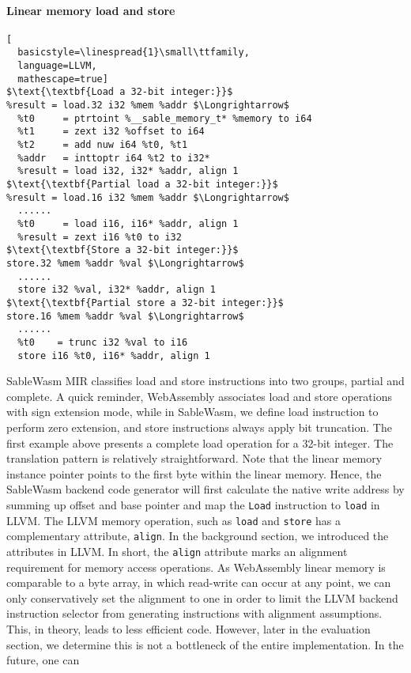 \paragraph{Linear memory load and store} \quad
\begin{lstlisting}[
  basicstyle=\linespread{1}\small\ttfamily, 
  language=LLVM, 
  mathescape=true]
$\text{\textbf{Load a 32-bit integer:}}$
%result = load.32 i32 %mem %addr $\Longrightarrow$
  %t0     = ptrtoint %__sable_memory_t* %memory to i64
  %t1     = zext i32 %offset to i64
  %t2     = add nuw i64 %t0, %t1
  %addr   = inttoptr i64 %t2 to i32*
  %result = load i32, i32* %addr, align 1
$\text{\textbf{Partial load a 32-bit integer:}}$
%result = load.16 i32 %mem %addr $\Longrightarrow$
  ......
  %t0     = load i16, i16* %addr, align 1
  %result = zext i16 %t0 to i32
$\text{\textbf{Store a 32-bit integer:}}$
store.32 %mem %addr %val $\Longrightarrow$
  ......
  store i32 %val, i32* %addr, align 1
$\text{\textbf{Partial store a 32-bit integer:}}$
store.16 %mem %addr %val $\Longrightarrow$
  ...... 
  %t0    = trunc i32 %val to i16
  store i16 %t0, i16* %addr, align 1
\end{lstlisting}
SableWasm MIR classifies load and store instructions into two groups,
partial and complete. A quick reminder, WebAssembly associates load and store
operations with sign extension mode, while in SableWasm, we define load
instruction to perform zero extension, and store instructions always apply bit
truncation. The first example above presents a complete load operation for a
32-bit integer. The translation pattern is relatively straightforward. Note
that the linear memory instance pointer points to the first byte within the
linear memory. Hence, the SableWasm backend code generator will first calculate
the native write address by summing up offset and base pointer and map the
\texttt{Load} instruction to \texttt{load} in LLVM. The LLVM memory operation,
such as \texttt{load} and \texttt{store} has a complementary attribute,
\texttt{align}. In the background section, we introduced the attributes in
LLVM. In short, the \texttt{align} attribute marks an alignment requirement for
memory access operations. As WebAssembly linear memory is comparable to a byte
array, in which read-write can occur at any point, we can only conservatively
set the alignment to one in order to limit the LLVM backend instruction selector
from generating instructions with alignment assumptions. This, in theory, leads
to less efficient code. However, later in the evaluation section, we determine
this is not a bottleneck of the entire implementation. In the future, one can
